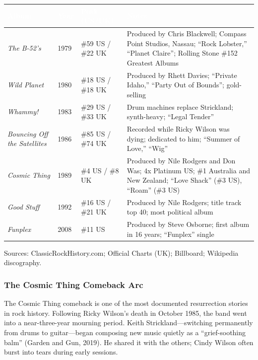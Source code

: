 \documentclass[11pt,letterpaper]{article}
\newcommand{\tableheader}[1]{\textbf{\sffamily\textcolor{white}{#1}}}
\begin{document}
\begin{center}
\begin{tabularx}{\textwidth}{L{3.5cm}C{1.2cm}L{3.5cm}X}
\toprule
{}
\tableheader{Album} & \tableheader{Year} & \tableheader{Peak (US/UK)} & \tableheader{Notes} \\
\midrule
\textit{The B-52's} & 1979 & \#59 US / \#22 UK & Produced by Chris Blackwell; Compass Point Studios, Nassau; ``Rock Lobster,'' ``Planet Claire''; Rolling Stone \#152 Greatest Albums \\
\textit{Wild Planet} & 1980 & \#18 US / \#18 UK & Produced by Rhett Davies; ``Private Idaho,'' ``Party Out of Bounds''; gold-selling \\
\textit{Whammy!} & 1983 & \#29 US / \#33 UK & Drum machines replace Strickland; synth-heavy; ``Legal Tender'' \\
\textit{Bouncing Off the Satellites} & 1986 & \#85 US / \#74 UK & Recorded while Ricky Wilson was dying; dedicated to him; ``Summer of Love,'' ``Wig'' \\
\textit{Cosmic Thing} & 1989 & \#4 US / \#8 UK & Produced by Nile Rodgers and Don Was; 4x Platinum US; \#1 Australia and New Zealand; ``Love Shack'' (\#3 US), ``Roam'' (\#3 US) \\
\textit{Good Stuff} & 1992 & \#16 US / \#21 UK & Produced by Nile Rodgers; title track top 40; most political album \\
\textit{Funplex} & 2008 & \#11 US & Produced by Steve Osborne; first album in 16 years; ``Funplex'' single \\
\bottomrule
\end{tabularx}
\end{center}

Sources: ClassicRockHistory.com; Official Charts (UK); Billboard; Wikipedia discography.

\subsubsection{The Cosmic Thing Comeback Arc}

The Cosmic Thing comeback is one of the most documented resurrection stories in rock history. Following Ricky Wilson's death in October 1985, the band went into a near-three-year mourning period. Keith Strickland---switching permanently from drums to guitar---began composing new music quietly as a ``grief-soothing balm'' (Garden and Gun, 2019). He shared it with the others; Cindy Wilson often burst into tears during early sessions.
\end{document}
